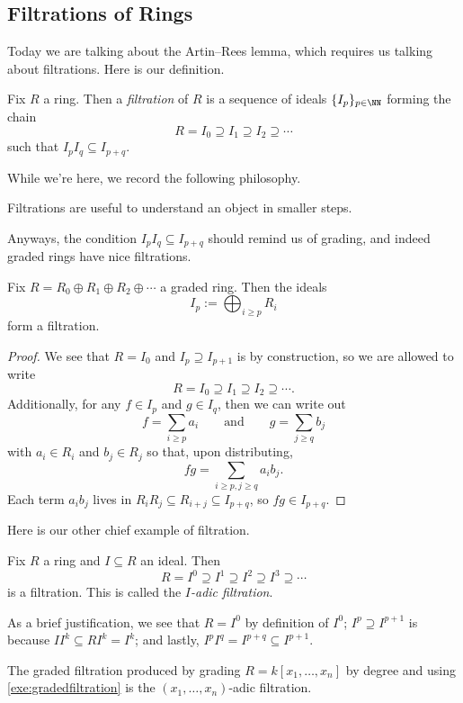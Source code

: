 \subsection{Filtrations of Rings}
Today we are talking about the Artin--Rees lemma, which requires us talking about filtrations. Here is our definition.
\begin{definition}
	Fix $R$ a ring. Then a \textit{filtration} of $R$ is a sequence of ideals $\{I_p\}_{p\in\NN}$ forming the chain
	\[R=I_0\supseteq I_1\supseteq I_2\supseteq\cdots\]
	such that $I_pI_q\subseteq I_{p+q}$.
\end{definition}
While we're here, we record the following philosophy.
\begin{idea}
	Filtrations are useful to understand an object in smaller steps.
\end{idea}
Anyways, the condition $I_pI_q\subseteq I_{p+q}$ should remind us of grading, and indeed graded rings have nice filtrations.
\begin{exe} \label{exe:gradedfiltration}
	Fix $R=R_0\oplus R_1\oplus R_2\oplus\cdots$ a graded ring. Then the ideals
	\[I_p:=\bigoplus_{i\ge p}R_i\]
	form a filtration.
\end{exe}
\begin{proof}
	We see that $R=I_0$ and $I_p\supseteq I_{p+1}$ is by construction, so we are allowed to write
	\[R=I_0\supseteq I_1\supseteq I_2\supseteq\cdots.\]
	Additionally, for any $f\in I_p$ and $g\in I_q$, then we can write out
	\[f=\sum_{i\ge p}a_i\qquad\text{and}\qquad g=\sum_{j\ge q}b_j\]
	with $a_i\in R_i$ and $b_j\in R_j$ so that, upon distributing,
	\[fg=\sum_{i\ge p,j\ge q}a_ib_j.\]
	Each term $a_ib_j$ lives in $R_iR_j\subseteq R_{i+j}\subseteq I_{p+q}$, so $fg\in I_{p+q}$.
\end{proof}
Here is our other chief example of filtration.
\begin{defihelper} 
	Fix $R$ a ring and $I\subseteq R$ an ideal. Then
	\[R=I^0\supseteq I^1\supseteq I^2\supseteq I^3\supseteq\cdots\]
	is a filtration. This is called the \textit{$I$-adic filtration}.
\end{defihelper}
As a brief justification, we see that $R=I^0$ by definition of $I^0$; $I^p\supseteq I^{p+1}$ is because $II^k\subseteq RI^k=I^k$; and lastly, $I^pI^q=I^{p+q}\subseteq I^{p+1}$.
\begin{exe}
	The graded filtration produced by grading $R=k[x_1,\ldots,x_n]$ by degree and using \autoref{exe:gradedfiltration} is the $(x_1,\ldots,x_n)$-adic filtration.
\end{exe}
